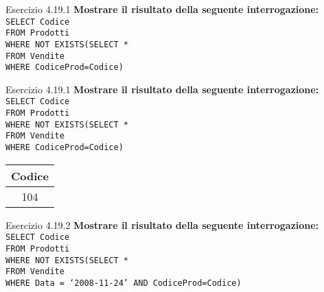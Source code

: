 \begin{frame}{Esercizio 4.19.1}
    \textbf{Mostrare il risultato della seguente interrogazione:}\\
    \texttt{SELECT Codice\\FROM Prodotti\\WHERE NOT EXISTS(SELECT *\\\hspace{8,5em}FROM Vendite\\\hspace{8,5em}WHERE CodiceProd=Codice)}
\end{frame}

\begin{frame}{Esercizio 4.19.1}
    \textbf{Mostrare il risultato della seguente interrogazione:}\\
    \texttt{SELECT Codice\\FROM Prodotti\\WHERE NOT EXISTS(SELECT *\\\hspace{8,5em}FROM Vendite\\\hspace{8,5em}WHERE CodiceProd=Codice)}
    \vspace{1em}
    \begin{table}[h]
\centering
\begin{minipage}{.45\textwidth}
\centering
\begin{tabular}{|c|}
\hline
\rowcolor{cyan!30} Codice \\
\hline
104\\
\hline
\end{tabular}
\end{minipage}%
\end{table}
\end{frame}

\begin{frame}{Esercizio 4.19.2}
    \textbf{Mostrare il risultato della seguente interrogazione:}\\
    \texttt{SELECT Codice\\FROM Prodotti\\WHERE NOT EXISTS(SELECT *\\\hspace{8,5em}FROM Vendite\\\hspace{8,5em}WHERE Data = `2008-11-24' AND CodiceProd=Codice)}
\end{frame}


